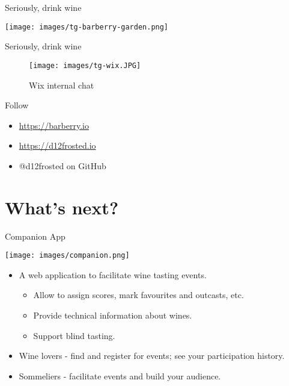 \documentclass[presentation,aspectratio=169,smaller]{beamer}
\begin{document}
\begin{frame}[label={sec:org8c2c63d}]{Seriously, drink wine}
\begin{center}
\texttt{[image: images/tg-barberry-garden.png]}
\end{center}
\end{frame}

\begin{frame}[label={sec:orged92127}]{Seriously, drink wine}
\begin{figure}[htbp]
\centering
\texttt{[image: images/tg-wix.JPG]}
\caption{Wix internal chat}
\end{figure}
\end{frame}

\begin{frame}[label={sec:org45ed7ba}]{Follow}
\begin{itemize}
\item \url{https://barberry.io}
\item \url{https://d12frosted.io}
\item @d12frosted on GitHub
\end{itemize}
\end{frame}

\section{What's next?}
\label{sec:org16a6492}

\begin{frame}[label={sec:orgcd8166a}]{Companion App}
\begin{center}
\texttt{[image: images/companion.png]}
\end{center}

\begin{itemize}
\item A web application to facilitate wine tasting events.
\begin{itemize}
\item Allow to assign scores, mark favourites and outcasts, etc.
\item Provide technical information about wines.
\item Support blind tasting.
\end{itemize}
\item Wine lovers - find and register for events; see your participation history.
\item Sommeliers - facilitate events and build your audience.
\end{itemize}
\end{frame}
\end{document}
